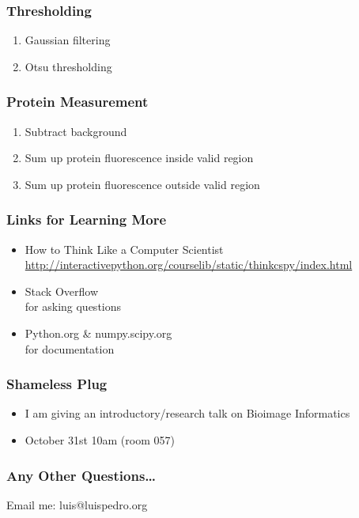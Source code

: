 \begin{frame}[fragile]
\frametitle{Thresholding}

\begin{enumerate}
\item Gaussian filtering
\item Otsu thresholding
\end{enumerate}
\end{frame}

\begin{frame}[fragile]
\frametitle{Protein Measurement}
\begin{enumerate}
\item Subtract background
\item Sum up protein fluorescence \alert{inside} valid region
\item Sum up protein fluorescence \alert{outside} valid region
\end{enumerate}
\end{frame}

\begin{frame}[fragile]
\frametitle{Links for Learning More}

\begin{itemize}
\item How to Think Like a Computer Scientist
    \url{http://interactivepython.org/courselib/static/thinkcspy/index.html}
\item Stack Overflow \\
    for asking questions
\item Python.org \& numpy.scipy.org \\
    for documentation
\end{itemize}

\end{frame}

\begin{frame}[fragile]
\frametitle{Shameless Plug}

\begin{itemize}
\item I am giving an introductory/research talk on \alert{Bioimage Informatics}
\item October 31st 10am (room 057)
\end{itemize}
\end{frame}

\begin{frame}[fragile]
\frametitle{Any Other Questions\ldots}
Email me: luis@luispedro.org
\end{frame}




